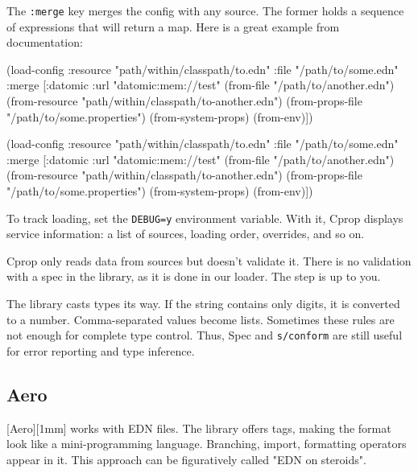The \verb|:merge| key merges the config with any source. The former holds a sequence of expressions that will return a map. Here is a great example from documentation:

\ifx\DEVICETYPE\MOBILE

\begin{english}
  \begin{clojure}
(load-config
 :resource "path/within/classpath/to.edn"
 :file "/path/to/some.edn"
 :merge
 [{:datomic {:url "datomic:mem://test"}}
  (from-file "/path/to/another.edn")
  (from-resource
  "path/within/classpath/to-another.edn")
  (from-props-file
   "/path/to/some.properties")
  (from-system-props)
  (from-env)])
  \end{clojure}
\end{english}

\else

\begin{english}
  \begin{clojure}
(load-config
 :resource "path/within/classpath/to.edn"
 :file "/path/to/some.edn"
 :merge [{:datomic {:url "datomic:mem://test"}}
         (from-file "/path/to/another.edn")
         (from-resource "path/within/classpath/to-another.edn")
         (from-props-file "/path/to/some.properties")
         (from-system-props)
         (from-env)])
  \end{clojure}
\end{english}

\fi

To track loading, set the \verb|DEBUG=y| environment variable. With it, Cprop displays service information: a list of sources, loading order, overrides, and so on.

Cprop only reads data from sources but doesn't validate it. There is no validation with a spec in the library, as it is done in our loader. The step is up to you.

The library casts types its way. If the string contains only digits, it is converted to a number. Comma-separated values become lists. Sometimes these rules are not enough for complete type control. Thus, Spec and \verb|s/conform| are still useful for error reporting and type inference.

\subsection{Aero}


[Aero][1mm] works with EDN files. The library offers tags, making the format look like a mini-programming language. Branching, import, formatting operators appear in it. This approach can be figuratively called "EDN on steroids".

